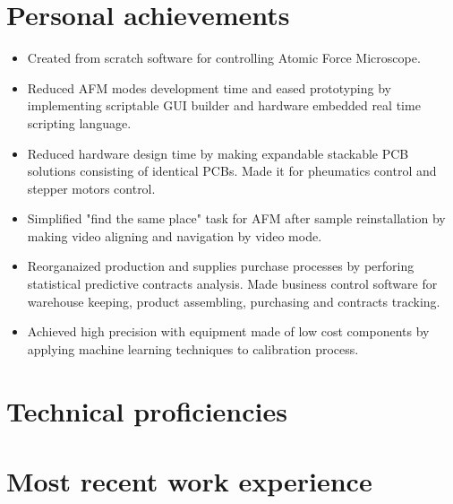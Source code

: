\documentclass{sb_cv}
\begin{document}
\section{Personal achievements}
\begin{itemize}
\item Created from scratch software for controlling Atomic Force Microscope.
\item Reduced AFM modes development time and eased prototyping by implementing scriptable GUI builder and hardware embedded real time scripting language.
\item Reduced hardware design time by making expandable stackable PCB solutions consisting of identical PCBs. Made it for pheumatics control and stepper motors control.
\item Simplified "find the same place" task for AFM after sample reinstallation by making video aligning and navigation by video mode.
\item Reorganaized production and supplies purchase processes by perforing statistical predictive contracts analysis. Made business control software for warehouse keeping, product assembling, purchasing and contracts tracking.
\item Achieved high precision with equipment made of low cost components by applying machine learning techniques to calibration process.
\end{itemize}

\vspace*{-4mm}
\section{Technical proficiencies}

\vspace*{-4mm}
\section{Most recent work experience}
\end{document}
